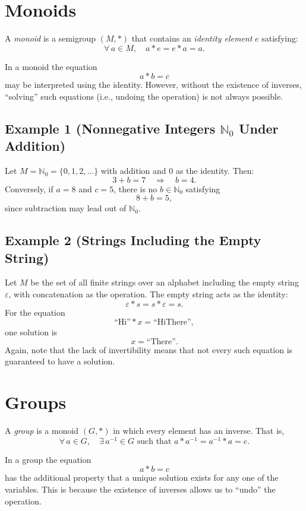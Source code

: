 \documentclass[11pt,openany]{article}
\begin{document}
\section{Monoids}
\begin{definition}[Monoid]
	A \emph{monoid} is a semigroup \((M,\ast)\) that contains an \emph{identity element} \(e\) satisfying:
	\[
	\forall\, a \in M,\quad a\ast e = e\ast a = a.
	\]
\end{definition}

In a monoid the equation
\[
a\ast b = c
\]
may be interpreted using the identity. However, without the existence of inverses, “solving” such equations (i.e., undoing the operation) is not always possible.

\subsection*{Example 1 (Nonnegative Integers \(\mathbb{N}_0\) Under Addition)}
Let \(M=\mathbb{N}_0 = \{0,1,2,\dots\}\) with addition and \(0\) as the identity. Then:
\[
3+b=7 \quad \Longrightarrow \quad b=4.
\]
Conversely, if \(a=8\) and \(c=5\), there is no \(b\in \mathbb{N}_0\) satisfying
\[
8+b=5,
\]
since subtraction may lead out of \(\mathbb{N}_0\).

\subsection*{Example 2 (Strings Including the Empty String)}
Let \(M\) be the set of all finite strings over an alphabet including the empty string \(\varepsilon\), with concatenation as the operation. The empty string acts as the identity:
\[
\varepsilon \ast s = s \ast \varepsilon = s.
\]
For the equation
\[
\text{``Hi''} \ast x = \text{``HiThere''},
\]
one solution is
\[
x = \text{``There''}.
\]
Again, note that the lack of invertibility means that not every such equation is guaranteed to have a solution.

\section{Groups}
\begin{definition}[Group]
	A \emph{group} is a monoid \((G,\ast)\) in which every element has an inverse. That is,
	\[
	\forall\, a \in G,\quad \exists\, a^{-1} \in G \text{ such that } a\ast a^{-1} = a^{-1}\ast a = e.
	\]
\end{definition}

In a group the equation
\[
a\ast b = c
\]
has the additional property that a unique solution exists for any one of the variables. This is because the existence of inverses allows us to “undo” the operation.
\end{document}
